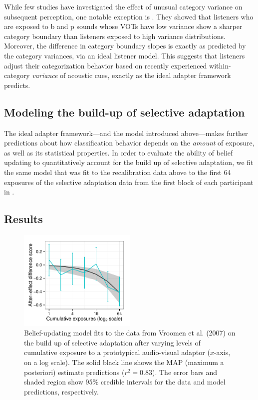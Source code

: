 While few studies have investigated the effect of unusual category variance on subsequent perception, one notable exception is \textcite{Clayards2008}.  They showed that listeners who are exposed to \ph b and \ph p sounds whose VOTs have low variance show a sharper category boundary than listeners exposed to high variance distributions.  Moreover, the difference in category boundary slopes is exactly as predicted by the category variances, via an ideal listener model.  This suggests that listeners adjust their categorization behavior based on recently experienced within-category \emph{variance} of acoustic cues, exactly as the ideal adapter framework predicts.

\subsection{Modeling the build-up of selective adaptation}
\label{sec:methods-results}

The ideal adapter framework---and the model introduced above---makes further predictions about how classification behavior depends on the \emph{amount} of exposure, as well as its statistical properties.  In order to evaluate the ability of belief updating to quantitatively account for the build up of selective adaptation, we fit the same model that was fit to the recalibration data above to the first 64 exposures of the selective adaptation data from the first block of each participant in \textcite{Vroomen2007}.

\subsection{Results}
\label{sec:results-discussion}

\begin{figure}[htb]
  \centering
  \includegraphics[width=0.5\textwidth]{figure/vroomen-selad-ae-fits-first-64.pdf}
  \caption{Belief-updating model fits to the data from Vroomen et al. (2007) on the build up of selective adaptation after varying levels of cumulative exposure to a prototypical audio-visual adaptor ($x$-axis, on a log scale).  The solid black line shows the MAP (maximum a posteriori) estimate predictions ($r^2=0.83$). The error bars and shaded region show 95\% credible intervals for the data and model predictions, respectively. }
  \label{fig:selad-buildup-preds}
\end{figure}

